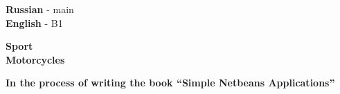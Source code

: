 

\begin{minipage}[t]{0.3\textwidth}
    \vspace{-\baselineskip} %


    \textbf{Russian} - main\\
    \textbf{English} - B1\\
\end{minipage}
\hfill
\begin{minipage}[t]{0.3\textwidth}
    \vspace{-\baselineskip} %


    \textbf{Sport} \\
    \textbf{Motorcycles}

\end{minipage}
\hfill
\begin{minipage}[t]{0.3\textwidth}
    \vspace{-\baselineskip} %


    \textbf{In the process of writing the book \enquote{Simple Netbeans Applications}}
\end{minipage}

